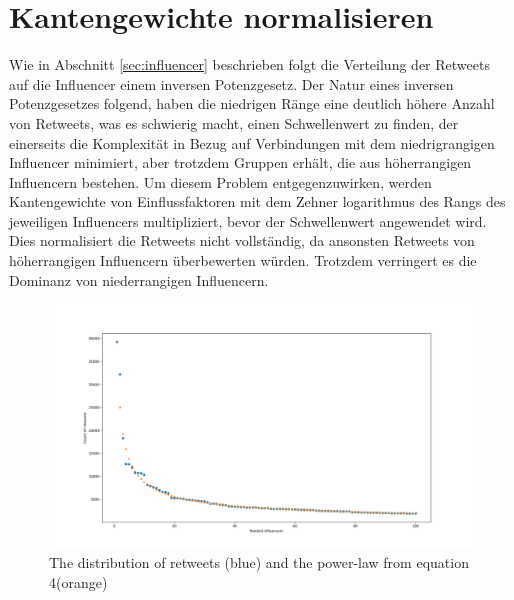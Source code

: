 \section{Kantengewichte normalisieren}
Wie in Abschnitt \ref{sec:influencer} beschrieben folgt die Verteilung der Retweets auf die Influencer einem inversen Potenzgesetz.
Der Natur eines inversen Potenzgesetzes folgend, haben die niedrigen Ränge eine deutlich höhere Anzahl von Retweets, was es schwierig macht, einen Schwellenwert zu finden, der einerseits die Komplexität in Bezug auf Verbindungen mit dem niedrigrangigen Influencer minimiert, aber trotzdem Gruppen erhält, die aus höherrangigen Influencern bestehen.
Um diesem Problem entgegenzuwirken, werden Kantengewichte von Einflussfaktoren mit dem Zehner logarithmus des Rangs des jeweiligen Influencers multipliziert, bevor der Schwellenwert angewendet wird.
Dies normalisiert die Retweets nicht vollständig, da ansonsten Retweets von höherrangigen Influencern überbewerten würden.
Trotzdem verringert es die Dominanz von niederrangigen Influencern.
\begin{figure}[h!]
	\centering
	\includegraphics[width=\linewidth]{images/power-law}
	\caption{The distribution of retweets (blue) and the power-law from equation 4(orange)}
	\label{fig:power-law}
\end{figure}
